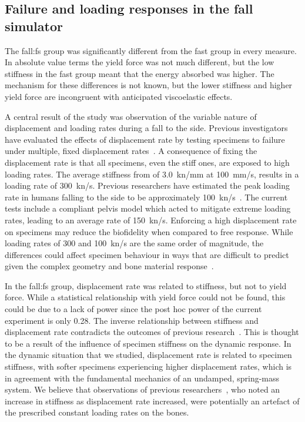 \subsection{Failure and loading responses in the fall simulator}
\label{sec:behave_fail_discssion_fail}
The fall:\ac{fs} group was significantly different from the fast group in every measure.
In absolute value terms the yield force was not much different, but the low stiffness in the fast group meant that the energy absorbed was higher.
The mechanism for these differences is not known, but the lower stiffness and higher yield force are incongruent with anticipated viscoelastic effects.

A central result of the study was observation of the variable nature of displacement and loading rates during a fall to the side.
Previous investigators have evaluated the effects of displacement rate by testing specimens to failure under multiple, fixed displacement rates~\citep{courtney_effects_1994, weber_proximal_1992}.
A consequence of fixing the displacement rate is that all specimens, even the stiff ones, are exposed to high loading rates.
The average stiffness from \citet{courtney_effects_1994} of 3.0~\ac{kn}/\ac{mm} at 100~\ac{mm}/\ac{s}, results in a loading rate of 300~\ac{kn}/\ac{s}.
Previous researchers have estimated the peak loading rate in humans falling to the side to be approximately 100~\ac{kn}/\ac{s}~\citep{laing_characterizing_2010}.
The current tests include a compliant pelvis model which acted to mitigate extreme loading rates, leading to an average rate of 150~\ac{kn}/\ac{s}.
Enforcing a high displacement rate on specimens may reduce the biofidelity when compared to free response.
While loading rates of 300 and 100~\ac{kn}/\ac{s} are the same order of magnitude, the differences could affect specimen behaviour in ways that are difficult to predict given the complex geometry and bone material response~\citep{carter_compressive_1977, robertson_compressive_1978, linde_mechanical_1991, hansen_effect_2008, zioupos_microcracking_2008}.

In the fall:\ac{fs} group, displacement rate was related to stiffness, but not to yield force.
While a statistical relationship with yield force could not be found, this could be due to a lack of power since the post hoc power of the current experiment is only 0.28.
The inverse relationship between stiffness and displacement rate contradicts the outcomes of previous research~\citep{courtney_effects_1994, weber_proximal_1992}.
This is thought to be a result of the influence of specimen stiffness on the dynamic response.
In the dynamic situation that we studied, displacement rate is related to specimen stiffness, with softer specimens experiencing higher displacement rates, which is in agreement with the fundamental mechanics of an undamped, spring-mass system.
We believe that observations of previous researchers~\citep{courtney_effects_1994, weber_proximal_1992}, who noted an increase in stiffness as displacement rate increased, were potentially an artefact of the prescribed constant loading rates on the bones.

